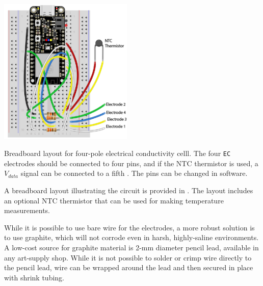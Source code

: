 \begin{marginfigure}[0cm]
	\begin{center}
		\includegraphics[height=7cm]{Images/ec_breadboard.png}
		\caption[Breadboard layout for four-pole \texttt{EC} cell]{Breadboard layout for four-pole electrical conductivity celll. The four \texttt{EC} electrodes should be connected to four \adc pins, and if the NTC thermistor is used, a $V_{data}$ signal can be connected to a fifth \adc.  The \adc pins can be changed in software.}
	\end{center}
\end{marginfigure}

A breadboard layout illustrating the circuit is provided in . The layout includes an optional NTC thermistor that can be used for making temperature measurements.

While it is possible to use bare wire for the electrodes, a more robust solution is to use graphite, which will not corrode even in harsh, highly-saline environments. A low-cost source for graphite material is 2-mm diameter pencil lead, available in any art-supply shop. While it is not possible to solder or crimp wire directly to the pencil lead, wire can be wrapped around the lead and then secured in place with shrink tubing.


